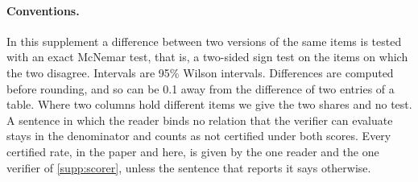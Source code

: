 \paragraph{Conventions.}
In this supplement a difference between two versions of the same items is tested with an exact McNemar test, that is, a two-sided sign test on the items on which the two disagree.
Intervals are 95\% Wilson intervals.
Differences are computed before rounding, and so can be 0.1 away from the difference of two entries of a table.
Where two columns hold different items we give the two shares and no test.
A sentence in which the reader binds no relation that the verifier can evaluate stays in the denominator and counts as not certified under both scores.
Every certified rate, in the paper and here, is given by the one reader and the one verifier of \cref{supp:scorer}, unless the sentence that reports it says otherwise.
